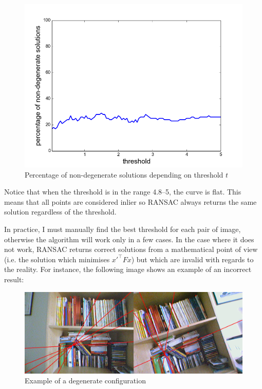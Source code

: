 \documentclass[11pt]{report}
\begin{document}
\begin{figure}[H]
	\centering
	\includegraphics[scale=0.7]{images/ransac-t.png}
    \caption{Percentage of non-degenerate solutions depending on threshold $t$}
    \label{fig:ransac-treshold}
\end{figure}

Notice that when the threshold is in the range 4.8--5, the curve is flat. This means that all points are considered inlier so RANSAC always returns the same solution regardless of the threshold.

In practice, I must manually find the best threshold for each pair of image, otherwise the algorithm will work only in a few cases. In the case where it does not work, RANSAC returns correct solutions from a mathematical point of view (i.e. the solution which minimises $x'^\top Fx$) but which are invalid with regards to the reality. For instance, the following image shows an example of an incorrect result:

\begin{figure}[H]
\includegraphics[scale=0.3]{images/degenerate.png}
\caption{Example of a degenerate configuration}
\end{figure}
\end{document}

